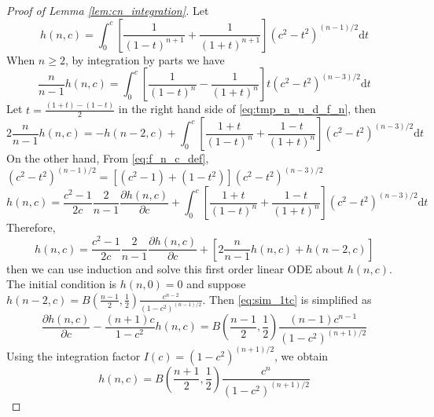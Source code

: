 \documentclass{aptpub}
\def\d{\mathrm{d}}
\begin{document}
\begin{proof}[Proof of Lemma \ref{lem:cn_integration}]
     Let
\begin{equation}\label{eq:f_n_c_def}
h(n,c)=   \int_0^{c}
    [\frac{1}{(1-t)^{n+1}}+\frac{1}{(1+t)^{n+1}}]
    (c^2- t^2)^{(n-1)/2}\d t
\end{equation}
When $n\geq 2$, by integration by parts 
we have 
\begin{equation}\label{eq:tmp_n_u_d_f_n}
    \frac{n}{n-1}h(n,c)
    =\int_0^{c}
    \left[\frac{1}{(1-t)^{n}}
    -\frac{1}{(1+t)^{n}}
    \right]
    t(c^2- t^2)^{(n-3)/2}
    \d t
\end{equation}
Let $t=\frac{(1+t)-(1-t)}{2}$ in the right hand side
of \eqref{eq:tmp_n_u_d_f_n}, then
\begin{equation}
    2\frac{n}{n-1}h(n,c)
=    -h(n-2,c)  
+ \int_0^{c}
\left[\frac{1+t}{(1-t)^{n}}
+\frac{1-t}{(1+t)^{n}}
\right]
(c^2- t^2)^{(n-3)/2}
\d t
\end{equation}
On the other hand,
From \eqref{eq:f_n_c_def},
$(c^2-t^2)^{(n-1)/2}
=[(c^2-1)+(1-t^2)](c^2-t^2)^{(n-3)/2}$
\begin{equation}
    h(n, c) = \frac{c^2-1}{2c}\frac{2}{n-1}\frac{\partial h(n,c)}{\partial c}
    +  \int_0^{c}
    \left[\frac{1+t}{(1-t)^{n}}
    +\frac{1-t}{(1+t)^{n}}
    \right]
    (c^2- t^2)^{(n-3)/2}
    \d t
\end{equation}
Therefore,
\begin{equation}\label{eq:sim_1tc}
    h(n,c)=\frac{c^2-1}{2c}\frac{2}{n-1}\frac{\partial h(n,c)}{\partial c}
    + [2\frac{n}{n-1} h(n,c) + h(n-2, c)]
\end{equation}
then we can use induction and solve this
first order linear ODE about $h(n,c)$.
The initial condition is $h(n,0)=0$ and
suppose
$h(n-2,c)=B(\frac{n-1}{2}, \frac{1}{2})
\frac{c^{n-2}}{(1-c^2)^{(n-1)/2}}$.
Then \eqref{eq:sim_1tc} is simplified as
\begin{equation}
    \frac{\partial h(n,c)}{\partial c}
    - \frac{(n+1)c}{1-c^2} h(n,c)
    = B(\frac{n-1}{2}, \frac{1}{2})\frac{(n-1)c^{n-1}}{(1-c^2)^{(n+1)/2}}
\end{equation}
Using the integration factor $I(c)=(1-c^2)^{(n+1)/2}$, we obtain
\begin{equation}\label{eq:f_n_c_expression}
    h(n,c)= B(\frac{n+1}{2}, \frac{1}{2})
    \frac{c^n}{(1-c^2)^{(n+1)/2}}
\end{equation}

\end{proof}
\end{document}
